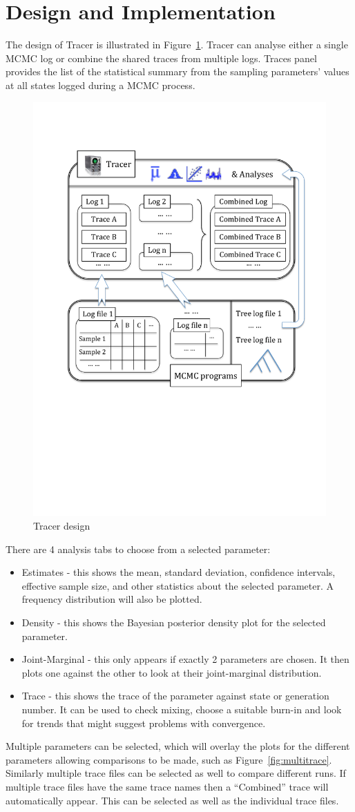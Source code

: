 \documentclass{bioinfo}
\begin{document}
\section*{Design and Implementation}

The design of Tracer is illustrated in Figure~\ref{fig:tracer}. Tracer can analyse either a single MCMC log or combine the shared traces from multiple logs. Traces panel provides the list of the statistical summary from the sampling parameters' values at all states logged during a MCMC process. 

\begin{figure}[ht]
\includegraphics[width=.38\textwidth]{./figures/tracer.pdf}  
\caption{Tracer design}
\label{fig:tracer}
\end{figure}

There are 4 analysis tabs to choose from a selected parameter:
\begin{itemize}
\item Estimates - this shows the mean, standard deviation, confidence intervals, effective sample size, and other statistics about the selected parameter. A frequency distribution will also be plotted.
\item Density - this shows the Bayesian posterior density plot for the selected parameter.
\item Joint-Marginal - this only appears if exactly 2 parameters are chosen. It then plots one against the other to look at their joint-marginal distribution.
\item Trace - this shows the trace of the parameter against state or generation number. It can be used to check mixing, choose a suitable burn-in and look for trends that might suggest problems with convergence.
\end{itemize}

Multiple parameters can be selected, which will overlay the plots for the different parameters allowing comparisons to be made, such as Figure~\ref{fig:multitrace}. Similarly multiple trace files can be selected as well to compare different runs. If multiple trace files have the same trace names then a ``Combined'' trace will automatically appear. This can be selected as well as the individual trace files.
\end{document}
